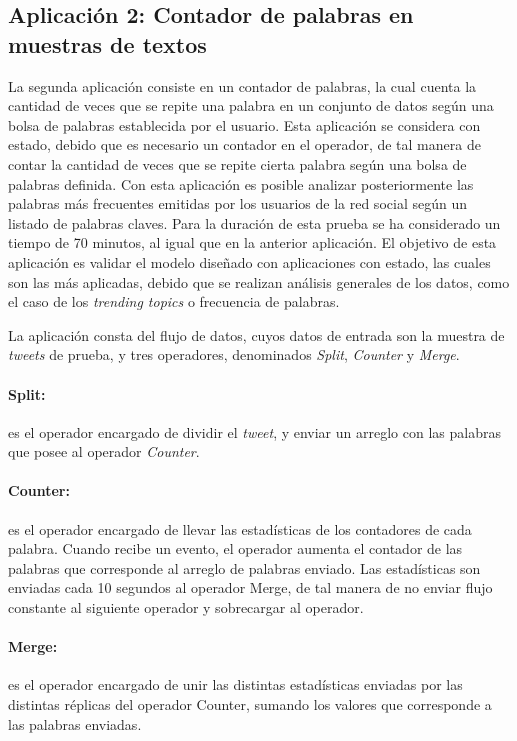 \subsection{Aplicación 2: Contador de palabras en muestras de textos}
La segunda aplicación consiste en un contador de palabras, la cual cuenta la cantidad de veces que se repite una palabra en un conjunto de datos según una bolsa de palabras establecida por el usuario. Esta aplicación se considera con estado, debido que es necesario un contador en el operador, de tal manera de contar la cantidad de veces que se repite cierta palabra según una bolsa de palabras definida. Con esta aplicación es posible analizar posteriormente las palabras más frecuentes emitidas por los usuarios de la red social según un listado de palabras claves. Para la duración de esta prueba se ha considerado un tiempo de 70 minutos, al igual que en la anterior aplicación. El objetivo de esta aplicación es validar el modelo diseñado con aplicaciones con estado, las cuales son las más aplicadas, debido que se realizan análisis generales de los datos, como el caso de los \textit{trending topics} o frecuencia de palabras.

La aplicación consta del flujo de datos, cuyos datos de entrada son la muestra de \textit{tweets} de prueba, y tres operadores, denominados \textit{Split}, \textit{Counter} y \textit{Merge}.

\paragraph{Split:} es el operador encargado de dividir el \textit{tweet}, y enviar un arreglo con las palabras que posee al operador \textit{Counter}.

\paragraph{Counter:} es el operador encargado de llevar las estadísticas de los contadores de cada palabra. Cuando recibe un evento, el operador aumenta el contador de las palabras que corresponde al arreglo de palabras enviado. Las estadísticas son enviadas cada 10 segundos al operador Merge, de tal manera de no enviar flujo constante al siguiente operador y sobrecargar al operador.

\paragraph{Merge:} es el operador encargado de unir las distintas estadísticas enviadas por las distintas réplicas del operador Counter, sumando los valores que corresponde a las palabras enviadas.

